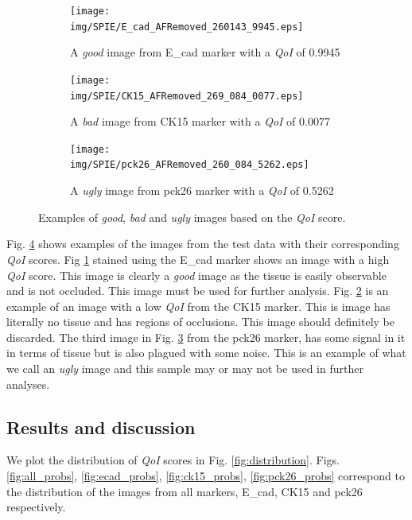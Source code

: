 \begin{figure} [ht!]
    \centering
    \begin{subfigure}[b]{0.3\textwidth}
        \centering
        \texttt{[image: img/SPIE/E\_cad\_AFRemoved\_260143\_9945.eps]}
        \caption{A \textit{good} image from E\_cad marker with a \textit{QoI} of 0.9945}
        \label{fig:good}
    \end{subfigure}
    \hfill
    \begin{subfigure}[b]{0.3\textwidth}
        \centering
        \texttt{[image: img/SPIE/CK15\_AFRemoved\_269\_084\_0077.eps]}
        \caption{A \textit{bad} image from CK15 marker with a \textit{QoI} of 0.0077}
        \label{fig:bad}
    \end{subfigure}
    \hfill
    \begin{subfigure}[b]{0.3\textwidth}
        \centering
        \texttt{[image: img/SPIE/pck26\_AFRemoved\_260\_084\_5262.eps]}
        \caption{A \textit{ugly} image from pck26 marker with a \textit{QoI} of 0.5262}
        \label{fig:ugly}
    \end{subfigure}
    \caption{Examples of \textit{good}, \textit{bad} and \textit{ugly} images based on the \textit{QoI} score.}
    \label{fig:gbu}
\end{figure}

Fig. \ref{fig:gbu} shows examples of the images from the test data with their corresponding \textit{QoI} scores. Fig \ref{fig:good} stained using the E\_cad marker shows an image with a high \textit{QoI} score. This image is clearly a \textit{good} image as the tissue is easily observable and is not occluded. This image must be used for further analysis. Fig. \ref{fig:bad} is an example of an image with a low \textit{QoI} from the CK15 marker. This is image has literally no tissue and has regions of occlusions. This image should definitely be discarded. The third image in Fig. \ref{fig:ugly} from the pck26 marker, has some signal in it in terms of tissue but is also plagued with some noise. This is an example of what we call an \textit{ugly} image and this sample may or may not be used in further analyses.

\subsection{Results and discussion}
We plot the distribution of \textit{QoI} scores in Fig. \ref{fig:distribution}. Figs. \ref{fig:all_probs}, \ref{fig:ecad_probs}, \ref{fig:ck15_probs}, \ref{fig:pck26_probs} correspond to the distribution of the images from all markers, E\_cad, CK15 and pck26 respectively. 


